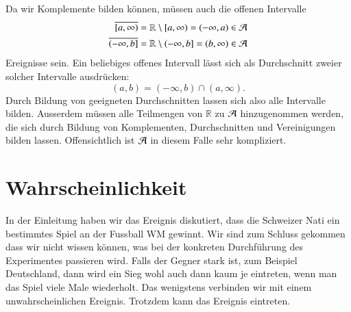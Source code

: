 Da wir Komplemente bilden können, müssen auch die offenen Intervalle
\begin{align*}
\overline{[a,\infty)}&=\mathbb R\setminus [a,\infty)=(-\infty,a)\in\cal A\\
\overline{(-\infty,b]}&=\mathbb R\setminus (-\infty,b]= (b,\infty)\in\cal A
\end{align*}
Ereignisse sein.
Ein beliebiges offenes Intervall lässt sich
als Durchschnitt zweier solcher Intervalle ausdrücken:
\[
(a,b)=(-\infty, b)\cap(a,\infty).
\]
Durch Bildung von geeigneten Durchschnitten lassen sich also alle
Intervalle bilden.
Ausserdem müssen alle Teilmengen von $\mathbb R$
zu $\cal A$ hinzugenommen werden, die sich durch Bildung von Komplementen,
Durchschnitten und Vereinigungen bilden lassen.
Offensichtlich ist $\cal A$
in diesem Falle sehr kompliziert.

\section{Wahrscheinlichkeit} \label{section-wahrscheinlichkeit}
In der Einleitung haben wir das Ereignis diskutiert, dass die Schweizer
Nati ein bestimmtes Spiel an der Fussball WM gewinnt.
Wir sind zum Schluss
gekommen dass wir nicht wissen können, was bei der konkreten
Durchführung des Experimentes passieren wird.
Falls der Gegner
stark ist, zum Beispiel Deutschland, dann wird ein Sieg wohl auch
dann kaum je eintreten, wenn man das Spiel viele Male wiederholt.
Das wenigstens verbinden wir mit einem unwahrscheinlichen Ereignis.
Trotzdem kann das Ereignis eintreten.

